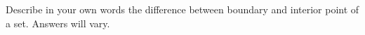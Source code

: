 {Describe in your own words the difference between boundary and interior point of a set.}
{Answers will vary.
}